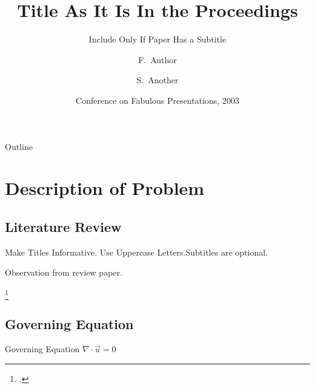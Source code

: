 \documentclass[aspectratio=169]{beamer}
\title[Short Paper Title] %
{Title As It Is In the Proceedings}
\subtitle
{Include Only If Paper Has a Subtitle}
\author[Author, Another] %
{F.~Author\inst{1} \and S.~Another\inst{2}}
\institute[Universities of Somewhere and Elsewhere] %
{
  \inst{1}%
  Department of Computer Science\\
  University of Somewhere
  \and
  \inst{2}%
  Department of Theoretical Philosophy\\
  University of Elsewhere}
\date[CFP 2003] %
{Conference on Fabulous Presentations, 2003}
\begin{document}
\begin{frame}
    \titlepage
\end{frame}

\begin{frame}{Outline}
    \tableofcontents
\end{frame}





\section{Description of Problem}

\subsection{Literature Review}

\begin{frame}{Make Titles Informative. Use Uppercase Letters.}{Subtitles are optional.}

    Observation from review paper. \footnotemark[1]
    \addtocounter{footnote}{1}
    \footcitetext[1]{alvesNumericalMethods2021}

\end{frame}

\subsection{Governing Equation}
\begin{frame}{Governing Equation}
    \begin{math}
        \nabla \cdot \vec{u} = 0
    \end{math}
\end{frame}
\end{document}
